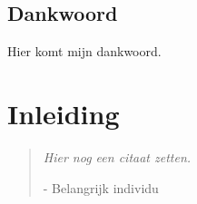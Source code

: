 \documentclass[dutch,12pt,oneside,a4paper]{book}
\newcommand{\phantomsection}{}
\begin{document}


\cleardoublepage
\section*{Dankwoord}

Hier komt mijn dankwoord. 

\newpage
\tableofcontents

\newpage
\mainmatter
\chapter{Inleiding}
\label{inleiding:chap}
\begin{quote}
{{\small\it Hier nog een citaat zetten.}}

{{\small\sc - Belangrijk individu}}
\end{quote}
\medskip




%



\cleardoublepage{}\phantomsection{}
\appendix


\backmatter
{}



\listoffigures
{}
\listoftables
\end{document}
